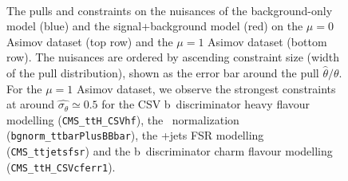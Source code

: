 \begin{figure}
\begin{centering}
 \\
\caption[The pulls and constraints of the combined fit model with the Asimov datasets]{The pulls and constraints on the nuisances of the background-only model (blue) and the signal+background model (red) on the $\mu=0$ Asimov dataset (top row) and the $\mu=1$ Asimov dataset (bottom row). The nuisances are ordered by ascending constraint size (width of the pull distribution), shown as the error bar around the pull $\hat{\theta} / \theta$. For the $\mu=1$ Asimov dataset, we observe the strongest constraints at around $\hat{\sigma_{\theta}} \simeq 0.5$ for the CSV b~discriminator heavy flavour modelling (\texttt{CMS\_ttH\_CSVhf}), the \ttbb~normalization (\texttt{bgnorm\_ttbarPlusBBbar}), the \ttbar+jets FSR modelling (\texttt{CMS\_ttjetsfsr}) and the b~discriminator charm flavour modelling (\texttt{CMS\_ttH\_CSVcferr1}).}
\label{fig:tth_sldl_pulls}
\end{centering}
\end{figure}


